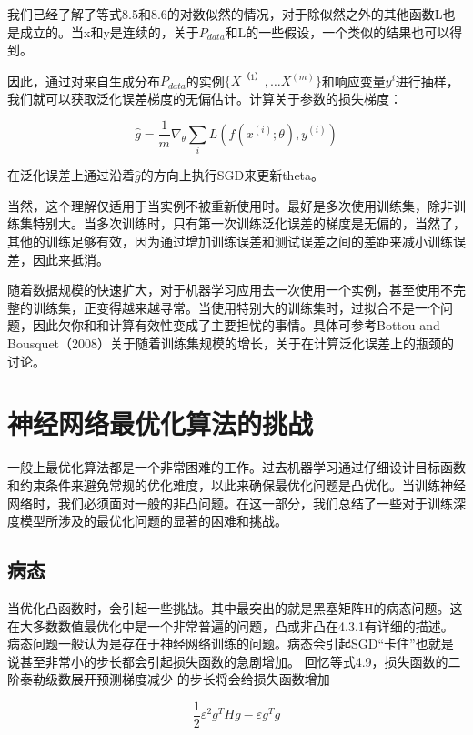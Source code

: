 我们已经了解了等式8.5和8.6的对数似然的情况，对于除似然之外的其他函数L也是成立的。当x和y是连续的，关于$P_{data}$和L的一些假设，一个类似的结果也可以得到。

因此，通过对来自生成分布$P_{data}$的实例$\{X^{（1）},\dots X^{(m)}\}$和响应变量$y^i$进行抽样，我们就可以获取泛化误差梯度的无偏估计。计算关于参数的损失梯度：

\begin{equation}
\hat{g}=\frac{1}{m}\nabla_{\theta}\sum_iL(f(x^{(i)};\theta),y^{(i)})
\end{equation}

在泛化误差上通过沿着$\hat{g}$的方向上执行SGD来更新theta。

当然，这个理解仅适用于当实例不被重新使用时。最好是多次使用训练集，除非训练集特别大。当多次训练时，只有第一次训练泛化误差的梯度是无偏的，当然了，其他的训练足够有效，因为通过增加训练误差和测试误差之间的差距来减小训练误差，因此来抵消。

随着数据规模的快速扩大，对于机器学习应用去一次使用一个实例，甚至使用不完整的训练集，正变得越来越寻常。当使用特别大的训练集时，过拟合不是一个问题，因此欠你和和计算有效性变成了主要担忧的事情。具体可参考Bottou and Bousquet（2008）关于随着训练集规模的增长，关于在计算泛化误差上的瓶颈的讨论。

\section{神经网络最优化算法的挑战}

一般上最优化算法都是一个非常困难的工作。过去机器学习通过仔细设计目标函数和约束条件来避免常规的优化难度，以此来确保最优化问题是凸优化。当训练神经网络时，我们必须面对一般的非凸问题。在这一部分，我们总结了一些对于训练深度模型所涉及的最优化问题的显著的困难和挑战。

\subsection{病态}

当优化凸函数时，会引起一些挑战。其中最突出的就是黑塞矩阵H的病态问题。这在大多数数值最优化中是一个非常普遍的问题，凸或非凸在4.3.1有详细的描述。
	病态问题一般认为是存在于神经网络训练的问题。病态会引起SGD“卡住”也就是说甚至非常小的步长都会引起损失函数的急剧增加。
	回忆等式4.9，损失函数的二阶泰勒级数展开预测梯度减少  的步长将会给损失函数增加

\begin{equation}
\frac{1}{2} \varepsilon^2 g^THg-\varepsilon g^Tg
\end{equation}

